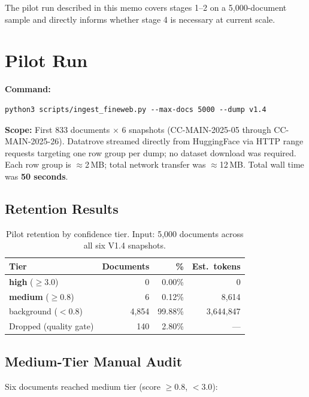 \documentclass[11pt]{article}
\begin{document}
The pilot run described in this memo covers stages 1--2 on a 5{,}000-document sample
and directly informs whether stage 4 is necessary at current scale.

\section{Pilot Run}

\textbf{Command:}
\begin{verbatim}
python3 scripts/ingest_fineweb.py --max-docs 5000 --dump v1.4
\end{verbatim}

\textbf{Scope:} First 833 documents $\times$ 6 snapshots (CC-MAIN-2025-05 through
CC-MAIN-2025-26). Datatrove streamed directly from HuggingFace via HTTP range
requests targeting one row group per dump; no dataset download was required.
Each row group is $\approx$2\,MB; total network transfer was $\approx$12\,MB.
Total wall time was \textbf{50 seconds}.

\subsection{Retention Results}

\begin{table}[h]
\centering
\begin{tabular}{lrrr}
\toprule
\textbf{Tier} & \textbf{Documents} & \textbf{\%} & \textbf{Est.\ tokens} \\
\midrule
\textbf{high} ($\geq 3.0$)   & 0      & 0.00\%  & 0           \\
\textbf{medium} ($\geq 0.8$) & 6      & 0.12\%  & 8{,}614     \\
background ($< 0.8$)         & 4{,}854 & 99.88\% & 3{,}644{,}847 \\
\midrule
Dropped (quality gate)       & 140    & 2.80\%  & ---         \\
\bottomrule
\end{tabular}
\caption{Pilot retention by confidence tier. Input: 5{,}000 documents across all six V1.4 snapshots.}
\end{table}

\subsection{Medium-Tier Manual Audit}

Six documents reached medium tier (score $\geq 0.8$, $< 3.0$):
\end{document}
